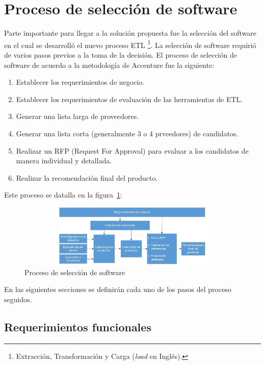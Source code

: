 \documentclass[a4paper,openright,12pt]{book}
\begin{document}
\section{Proceso de selección de software}

Parte importante para llegar a la solución propuesta fue la selección del
software en el cual se desarrolló el nuevo proceso ETL \footnote{Extracción,
  Transformación y Carga (\emph{load} en Inglés).}. La selección de software
requirió de varios pasos previos a la toma de la decisión. El proceso de
selección de software de acuerdo a la metodología de Accenture fue la siguiente:

\begin{enumerate}
\item Establecer los requerimientos de negocio.
\item Establecer los requerimientos de evaluación de las herramientas de ETL.
\item Generar una lista larga de proveedores.
\item Generar una lista corta (generalmente 3 o 4 prveedores) de candidatos.
\item Realizar  un RFP (Request For  Approval) para evaluar a  los candidatos de
  manera individual y detallada.
\item Realizar la recomendación final del producto.
\end{enumerate}

Este proceso se datalla en la figura~\ref{fig:proceso}:

\begin{figure}[htb]
  \begin{center}
    \includegraphics[width=12cm, height=3cm, scale=0.5]{Proceso_seleccion_software.jpg}
    \caption{Proceso de selección de software}
    \label{fig:proceso}
  \end{center}
\end{figure}

En las siguientes secciones se definirán cada uno de los pasos del proceso
seguidos.

\subsection{Requerimientos funcionales}
\end{document}
